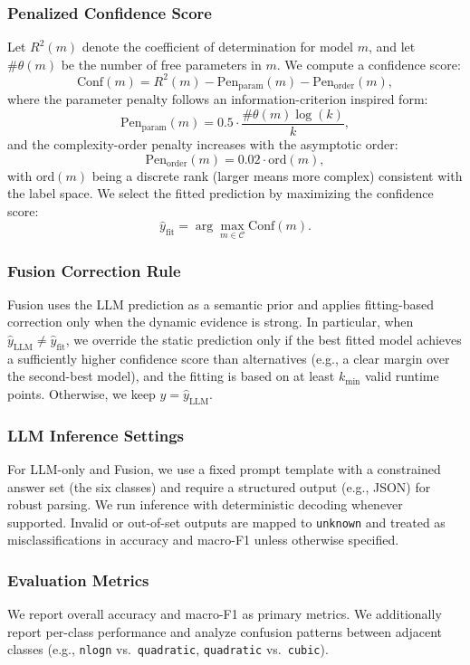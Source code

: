 \documentclass[conference]{IEEEtran}
\begin{document}
 \subsubsection{Penalized Confidence Score} 
 \label{subsubsec:setup_confidence} 
 Let $R^2(m)$ denote the coefficient of determination for model $m$, and let $\#\theta(m)$ be the number of 
 free parameters in $m$. 
 We compute a confidence score: 
 \[ 
 \mathrm{Conf}(m) = R^2(m) - \mathrm{Pen}_{\mathrm{param}}(m) - \mathrm{Pen}_{\mathrm{order}}(m), 
 \] 
 where the parameter penalty follows an information-criterion inspired form: 
 \[ 
 \mathrm{Pen}_{\mathrm{param}}(m) 
 = 0.5 \cdot \frac{\#\theta(m)\log(k)}{k}, 
 \] 
 and the complexity-order penalty increases with the asymptotic order: 
 \[ 
 \mathrm{Pen}_{\mathrm{order}}(m) = 0.02 \cdot \mathrm{ord}(m), 
 \] 
 with $\mathrm{ord}(m)$ being a discrete rank (larger means more complex) consistent with the label space. 
 We select the fitted prediction by maximizing the confidence score: 
 \[ 
 \hat{y}_{\text{fit}} = \arg\max_{m \in \mathcal{C}} \mathrm{Conf}(m). 
 \] 
 
 \subsubsection{Fusion Correction Rule} 
 \label{subsubsec:setup_fusion_rule} 
 Fusion uses the LLM prediction as a semantic prior and applies fitting-based correction only when the 
 dynamic evidence is strong. In particular, when $\hat{y}_{\text{LLM}} \neq \hat{y}_{\text{fit}}$, we override 
 the static prediction only if the best fitted model achieves a sufficiently higher confidence score than 
 alternatives (e.g., a clear margin over the second-best model), and the fitting is based on at least 
 $k_{\min}$ valid runtime points. Otherwise, we keep $\hat{y}=\hat{y}_{\text{LLM}}$. 
 
 \subsubsection{LLM Inference Settings} 
 \label{subsubsec:setup_llm} 
 For LLM-only and Fusion, we use a fixed prompt template with a constrained answer set (the six classes) 
 and require a structured output (e.g., JSON) for robust parsing. 
 We run inference with deterministic decoding whenever supported. 
 Invalid or out-of-set outputs are mapped to \texttt{unknown} and treated as misclassifications in accuracy 
 and macro-F1 unless otherwise specified. 
 
 \subsubsection{Evaluation Metrics} 
 \label{subsubsec:setup_metrics} 
 We report overall accuracy and macro-F1 as primary metrics. 
 We additionally report per-class performance and analyze confusion patterns between adjacent classes 
 (e.g., \texttt{nlogn} vs.\ \texttt{quadratic}, \texttt{quadratic} vs.\ \texttt{cubic}).
\end{document}
